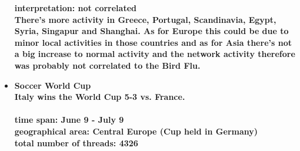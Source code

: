 \documentclass[11pt,a4paper,english]{article}
\begin{document}
\begin{itemize}
						\bf interpretation: \rm not correlated
						\\ There's more activity in Greece, Portugal, Scandinavia, Egypt, Syria, Singapur and Shanghai. As for Europe this could be due to minor local activities in those countries and as for Asia there's not a big increase to normal activity and the network activity therefore was probably not correlated to the Bird Flu.
	
					
					\item \bf Soccer World Cup \rm
						\\ Italy wins the World Cup 5-3 vs. France.
						\\\\ \bf time span: \rm June 9 - July 9
						\\ \bf geographical area: \rm Central Europe (Cup held in Germany)
						\\ \bf total number of threads: \rm 4326
						
						\begin{figure}[H]
							\vspace{-5pt}
  						

\end{figure}
\end{itemize}
\end{document}
